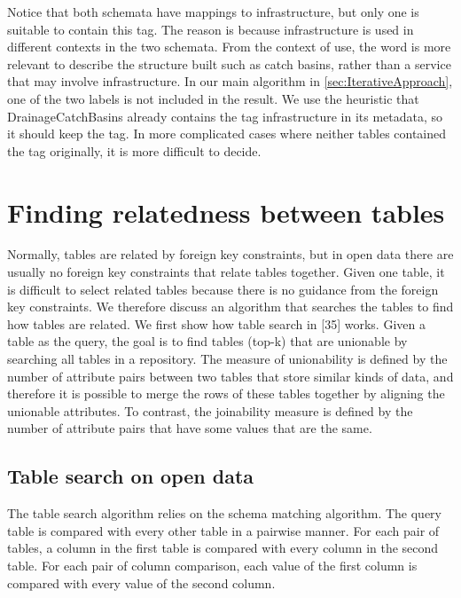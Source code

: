 Notice that both schemata have mappings to infrastructure, but only one is suitable to contain this tag. The reason is because infrastructure is used in different contexts in the two schemata. From the context of use, the word is more relevant to describe the structure built such as catch basins, rather than a service that may involve infrastructure. In our main algorithm in \autoref{sec:IterativeApproach}, one of the two labels is not included in the result. We use the heuristic that DrainageCatchBasins already contains the tag infrastructure in its metadata, so it should keep the tag. In more complicated cases where neither tables contained the tag originally, it is more difficult to decide.

\section{Finding relatedness between tables}
\label{sec:FindingRelatednessBetweenTables}

Normally, tables are related by foreign key constraints, but in open data there are usually no foreign key constraints that relate tables together. Given one table, it is difficult to select related tables because there is no guidance from the foreign key constraints. We therefore discuss an algorithm that searches the tables to find how tables are related. We first show how table search in \cite{Nargesian2018Table}[35] works. Given a table as the query, the goal is to find tables (top-k) that are unionable by searching all tables in a repository. The measure of unionability is defined by the number of attribute pairs between two tables that store similar kinds of data, and therefore it is possible to merge the rows of these tables together by aligning the unionable attributes. To contrast, the joinability measure is defined by the number of attribute pairs that have some values that are the same.

\subsection{Table search on open data}
\label{ssec:TableSearchOnOpenData}

The table search algorithm relies on the schema matching algorithm. The query table is compared with every other table in a pairwise manner. For each pair of tables, a column in the first table is compared with every column in the second table. For each pair of column comparison, each value of the first column is compared with every value of the second column.

